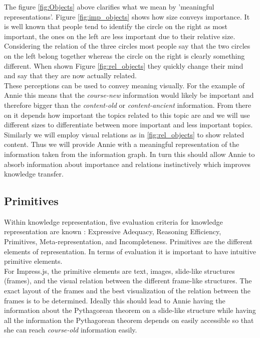 \documentclass[twoside, 12pt]{article}
\begin{document}
The figure \ref{fig:Objects} above clarifies what we mean by 'meaningful representations'. Figure \ref{fig:imp_objects} shows how size conveys importance. It is well known that people tend to identify the circle on the right as most important, the ones on the left are less important due to their relative size. Considering the relation of the three circles most people say that the two circles on the left belong together whereas the circle on the right is clearly something different. When shown Figure \ref{fig:rel_objects} they quickly change their mind and say that they are now actually related.\\

These perceptions can be used to convey meaning visually. For the example of Annie this means that the \textit{course-new} information would likely be important and therefore bigger than the \textit{content-old} or \textit{content-ancient} information. From there on it depends how important the topics related to this topic are and we will use different sizes to differentiate between more important and less important topics. Similarly we will employ visual relations as in \ref{fig:rel_objects} to show related content. Thus we will provide Annie with a meaningful representation of the information taken from the information graph. In turn this should allow Annie to absorb information about importance and relations instinctively which improves knowledge transfer.\\

\subsection{Primitives}
\label{sec:primitives}

Within knowledge representation, five evaluation criteria for knowledge representation are known \cite{Kohlhase:Complog:base}: Expressive Adequacy, Reasoning Efficiency, Primitives, Meta-representation, and Incompleteness. Primitives are the different elements of representation. In terms of evaluation it is important to have intuitive primitive elements. \\

For Impress.js, the primitive elements are text, images, slide-like structures (frames), and the visual relation between the different frame-like structures. The exact layout of the frames and the best visualization of the relation between the frames is to be determined. Ideally this should lead to Annie having the information about the Pythagorean theorem on a slide-like structure while having all the information the Pythagorean theorem depends on easily accessible so that she can reach \textit{course-old} information easily.  
\end{document}
